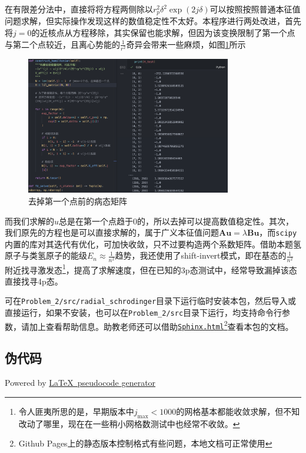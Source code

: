 在有限差分法中，直接将将方程两侧除以$r_p^2 \delta^2 \exp(2 j \delta) $可以按照按照普通本征值问题求解，但实际操作发现这样的数值稳定性不太好。本程序进行两处改进，首先将$j = 0$的近核点从方程移除，其实保留也能求解，但因为该变换限制了第一个点与第二个点较近，且离心势能的$\frac{1}{r^2}$奇异会带来一些麻烦，如图\ref{fig:ill}所示
\begin{figure}
    \centering
    \includegraphics[width=0.8\textwidth]{Problem_2/figs/ill_h_test.png}
    \caption{去掉第一个点前的病态矩阵}
    \label{fig:ill}
\end{figure}
而我们求解的$u$总是在第一个点趋于0的，所以去掉可以提高数值稳定性。其次，我们原先的方程也是可以直接求解的，属于广义本征值问题$\mathbf{A} \mathbf{u} = \lambda \mathbf{B} \mathbf{u}$，而\texttt{scipy}内置的库对其迭代有优化，可加快收敛，只不过要构造两个系数矩阵。借助本题氢原子与类氢原子的能级$E_n \approx \frac{1}{n^2}$趋势，我还使用了shift-invert模式，即在基态的$\frac{1}{n^2}$附近找寻激发态\footnote{令人匪夷所思的是，早期版本中$j_{\text{max}}<1000$的网格基本都能收敛求解，但不知改动了哪里，现在在一些稍小网格数测试中也经常不收敛。}，提高了求解速度，但在已知的3p态测试中，经常导致漏掉该态直接找寻4p态。

可在\texttt{Problem\_2/src/radial\_schrodinger}目录下运行临时安装本包，然后导入或直接运行，如果不安装，也可以在\texttt{Problem\_2/src}目录下运行，均支持命令行参数，请加上查看帮助信息。助教老师还可以借助\texttt{\href{https://bud-primordium.github.io/Computational-Physics-Fall-2024/Assignment_7/Problem_2/Sphinx.html}{Sphinx.html}}\footnote{Github Pages上的静态版本控制格式有些问题，本地文档可正常使用}查看本包的文档。
\subsection{伪代码}
Powered by \href{https://chatgpt.com/g/g-xJJAA2awf-latex-pseudocode-generator}{\LaTeX \ pseudocode generator}
